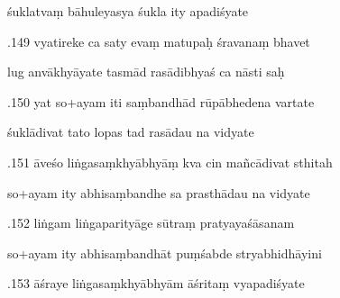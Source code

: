 \documentclass[article,12pt,a4paper]{memoir}%
\newcounter{parCount}
\begin{document}
	  
	  \pstart \leavevmode%
	śuklatvaṃ bāhuleyasya śukla ity apadiśyate 
	{}
	\pend%
      

	  
	  \pstart {}.149 vyatireke ca saty evaṃ matupaḥ śravanaṃ bhavet 
	{}
	\pend%
      

	  
	  \pstart \leavevmode%
	lug anvākhyāyate tasmād rasādibhyaś ca nāsti saḥ 
	{}
	\pend%
      

	  
	  \pstart {}.150 yat so+ayam iti saṃbandhād rūpābhedena vartate 
	{}
	\pend%
      

	  
	  \pstart \leavevmode%
	śuklādivat tato lopas tad rasādau na vidyate 
	{}
	\pend%
      

	  
	  \pstart {}.151 āveśo liṅgasaṃkhyābhyāṃ kva cin mañcādivat sthitah 
	{}
	\pend%
      

	  
	  \pstart \leavevmode%
	so+ayam ity abhisaṃbandhe sa prasthādau na vidyate 
	{}
	\pend%
      

	  
	  \pstart {}.152 liṅgam liṅgaparityāge sūtraṃ pratyayaśāsanam 
	{}
	\pend%
      

	  
	  \pstart \leavevmode%
	so+ayam ity abhisaṃbandhāt puṃśabde stryabhidhāyini 
	{}
	\pend%
      

	  
	  \pstart {}.153 āśraye liṅgasaṃkhyābhyām āśritaṃ vyapadiśyate 
	{}
	\pend%
      
\end{document}
